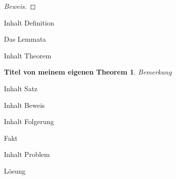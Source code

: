 \documentclass{beamer}
\begin{document}
	
	\begin{frame}
		\begin{proof}[Beweis]
			
		\end{proof}
		
		\begin{definition}
			Inhalt Definition
		\end{definition}
		
		\begin{lemma}
			Das Lemmata
		\end{lemma}
		
		\begin{theorem}
			Inhalt Theorem
		\end{theorem}
		
		\newtheorem{eigenesTheorem}{Titel von meinem eigenen Theorem}
		\begin{eigenesTheorem}
			Bemerkung
		\end{eigenesTheorem}
	\end{frame}

	\begin{frame}
	
		\begin{Satz}
			Inhalt Satz
		\end{Satz}
	
		\begin{Beweis}
			Inhalt Beweis
		\end{Beweis}
	
		\begin{Folgerung}
			Inhalt Folgerung
		\end{Folgerung}
	
		\begin{Fakt}
			Fakt
		\end{Fakt}
	\end{frame}

	\begin{frame}
		\begin{Problem}
			Inhalt Problem
		\end{Problem}
		
		\begin{Loesung}
			Lösung
		\end{Loesung}

	\end{frame}
	
	
	
\end{document}
